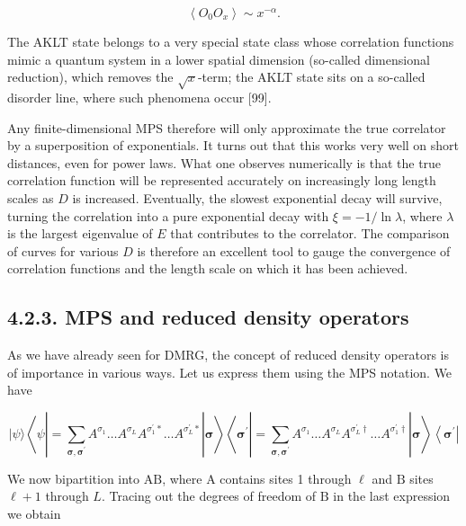 \documentclass[12pt]{article}
\begin{document}
\begin{equation*}
\left\langle O_{0} O_{x}\right\rangle \sim x^{-\alpha} . \tag{117}
\end{equation*}


The AKLT state belongs to a very special state class whose correlation functions mimic a quantum system in a lower spatial dimension (so-called dimensional reduction), which removes the $\sqrt{x}$-term; the AKLT state sits on a so-called disorder line, where such phenomena occur [99].

Any finite-dimensional MPS therefore will only approximate the true correlator by a superposition of exponentials. It turns out that this works very well on short distances, even for power laws. What one observes numerically is that the true correlation function will be represented accurately on increasingly long length scales as $D$ is increased. Eventually, the slowest exponential decay will survive, turning the correlation into a pure exponential decay with $\xi=-1 / \ln \lambda$, where $\lambda$ is the largest eigenvalue of $E$ that contributes to the correlator. The comparison of curves for various $D$ is therefore an excellent tool to gauge the convergence of correlation functions and the length scale on which it has been achieved.

\subsection*{4.2.3. MPS and reduced density operators}
As we have already seen for DMRG, the concept of reduced density operators is of importance in various ways. Let us express them using the MPS notation. We have


\begin{equation*}
|\psi\rangle\left\langle\psi\left|=\sum_{\boldsymbol{\sigma}, \boldsymbol{\sigma}^{\prime}} A^{\sigma_{1}} \ldots A^{\sigma_{L}} A^{\sigma_{1}^{\prime} *} \ldots A^{\sigma_{L}^{\prime} *}\right| \boldsymbol{\sigma}\right\rangle\left\langle\boldsymbol{\sigma}^{\prime}\left|=\sum_{\boldsymbol{\sigma}, \boldsymbol{\sigma}^{\prime}} A^{\sigma_{1}} \ldots A^{\sigma_{L}} A^{\sigma_{L}^{\prime} \dagger} \ldots A^{\sigma_{1}^{\prime} \dagger}\right| \boldsymbol{\sigma}\right\rangle\left\langle\boldsymbol{\sigma}^{\prime}\right| \tag{118}
\end{equation*}


We now bipartition into $\mathrm{AB}$, where $\mathrm{A}$ contains sites 1 through $\ell$ and $\mathrm{B}$ sites $\ell+1$ through $L$. Tracing out the degrees of freedom of $\mathrm{B}$ in the last expression we obtain
\end{document}
